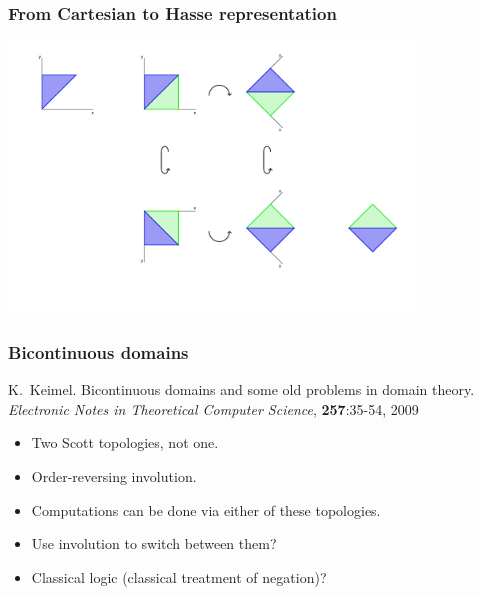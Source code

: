 \documentclass{beamer}
\begin{document}
\begin{frame}

  \frametitle{From Cartesian to Hasse representation}

{\center \includegraphics[height=72mm]{to_hasse.pdf}}


\end{frame}

\begin{frame}

  \frametitle{Bicontinuous domains}

K.~Keimel.  Bicontinuous domains and some old problems in domain theory. {\em Electronic Notes in Theoretical Computer Science}, {\bf 257}:35-54, 2009\\[2ex]

\begin{itemize}
  \item Two Scott topologies, not one.
  \item Order-reversing involution.
  \item Computations can be done via either of these topologies.
  \item Use involution to switch between them?
  \item Classical logic (classical treatment of negation)?
\end{itemize} 

\end{frame}
\end{document}
